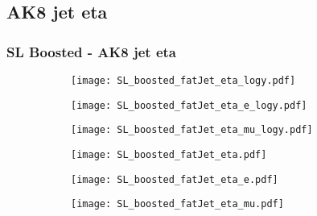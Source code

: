 \documentclass[aspectratio=169,8pt]{beamer}
\begin{document}
\subsection{AK8 jet eta}
\begin{frame}
\frametitle{SL Boosted - AK8 jet eta}
\begin{figure}
\captionsetup[subfigure]{labelformat=empty}
\begin{subfigure}{0.32\textwidth}
\texttt{[image: SL\_boosted\_fatJet\_eta\_logy.pdf]}
\vspace*{-0.15cm}
\end{subfigure}
\hfil
\begin{subfigure}{0.32\textwidth}
\texttt{[image: SL\_boosted\_fatJet\_eta\_e\_logy.pdf]}
\vspace*{-0.15cm}
\end{subfigure}
\hfil
\begin{subfigure}{0.32\textwidth}
\texttt{[image: SL\_boosted\_fatJet\_eta\_mu\_logy.pdf]}
\vspace*{-0.15cm}
\end{subfigure}
\hfil
\begin{subfigure}{0.32\textwidth}
\texttt{[image: SL\_boosted\_fatJet\_eta.pdf]}
\vspace*{-0.15cm}
\end{subfigure}
\hfil
\begin{subfigure}{0.32\textwidth}
\texttt{[image: SL\_boosted\_fatJet\_eta\_e.pdf]}
\vspace*{-0.15cm}
\end{subfigure}
\hfil
\begin{subfigure}{0.32\textwidth}
\texttt{[image: SL\_boosted\_fatJet\_eta\_mu.pdf]}
\vspace*{-0.15cm}
\end{subfigure}
\hfil
\end{figure}
\end{frame}
\newpage
\end{document}
